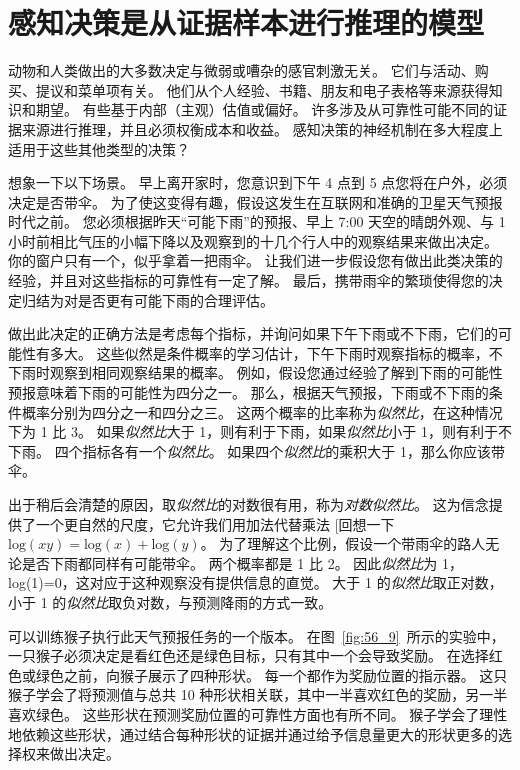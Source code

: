 \section{感知决策是从证据样本进行推理的模型}

动物和人类做出的大多数决定与微弱或嘈杂的感官刺激无关。
它们与活动、购买、提议和菜单项有关。
他们从个人经验、书籍、朋友和电子表格等来源获得知识和期望。
有些基于内部（主观）估值或偏好。
许多涉及从可靠性可能不同的证据来源进行推理，并且必须权衡成本和收益。
感知决策的神经机制在多大程度上适用于这些其他类型的决策？


想象一下以下场景。
早上离开家时，您意识到下午 4 点到 5 点您将在户外，必须决定是否带伞。
为了使这变得有趣，假设这发生在互联网和准确的卫星天气预报时代之前。
您必须根据昨天“可能下雨”的预报、早上 7:00 天空的晴朗外观、与 1 小时前相比气压的小幅下降以及观察到的十几个行人中的观察结果来做出决定。
你的窗户只有一个，似乎拿着一把雨伞。
让我们进一步假设您有做出此类决策的经验，并且对这些指标的可靠性有一定了解。
最后，携带雨伞的繁琐使得您的决定归结为对是否更有可能下雨的合理评估。


做出此决定的正确方法是考虑每个指标，并询问如果下午下雨或不下雨，它们的可能性有多大。
这些似然是条件概率的学习估计，下午下雨时观察指标的概率，不下雨时观察到相同观察结果的概率。
例如，假设您通过经验了解到下雨的可能性预报意味着下雨的可能性为四分之一。
那么，根据天气预报，下雨或不下雨的条件概率分别为四分之一和四分之三。
这两个概率的比率称为\textit{似然比}，在这种情况下为 1 比 3。
如果\textit{似然比}大于 1，则有利于下雨，如果\textit{似然比}小于 1，则有利于不下雨。
四个指标各有一个\textit{似然比}。
如果四个\textit{似然比}的乘积大于 1，那么你应该带伞。


出于稍后会清楚的原因，取\textit{似然比}的对数很有用，称为\textit{对数似然比}。
这为信念提供了一个更自然的尺度，它允许我们用加法代替乘法 [回想一下$\text{log}(xy) = \text{log}(x) + \text{log}(y) $。
为了理解这个比例，假设一个带雨伞的路人无论是否下雨都同样有可能带伞。
两个概率都是 1 比 2。
因此\textit{似然比}为 1，log(1)=0，这对应于这种观察没有提供信息的直觉。
大于 1 的\textit{似然比}取正对数，小于 1 的\textit{似然比}取负对数，与预测降雨的方式一致。


可以训练猴子执行此天气预报任务的一个版本。
在图~\ref{fig:56_9}~所示的实验中，一只猴子必须决定是看红色还是绿色目标，只有其中一个会导致奖励。
在选择红色或绿色之前，向猴子展示了四种形状。
每一个都作为奖励位置的指示器。
这只猴子学会了将预测值与总共 10 种形状相关联，其中一半喜欢红色的奖励，另一半喜欢绿色。
这些形状在预测奖励位置的可靠性方面也有所不同。
猴子学会了理性地依赖这些形状，通过结合每种形状的证据并通过给予信息量更大的形状更多的选择权来做出决定。


